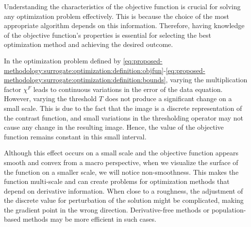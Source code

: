 			Understanding the characteristics of the objective function is crucial for solving any optimization problem effectively. This is because the choice of the most appropriate algorithm depends on this information. Therefore, having knowledge of the objective function's properties is essential for selecting the best optimization method and achieving the desired outcome.
			
			In the optimization problem defined by \eqref{eq:proposed-methodology:surrogate:optimization:definition:objfun}-\eqref{eq:proposed-methodology:surrogate:optimization:definition:bounds}, varying the multiplication factor $\chi^F$ leads to continuous variations in the error of the data equation. However, varying the threshold $T$ does not produce a significant change on a small scale. This is due to the fact that the image is a discrete representation of the contrast function, and small variations in the thresholding operator may not cause any change in the resulting image. Hence, the value of the objective function remains constant in this small interval.
			
			Although this effect occurs on a small scale and the objective function appears smooth and convex from a macro perspective, when we visualize the surface of the function on a smaller scale, we will notice non-smoothness. This makes the function multi-scale and can create problems for optimization methods that depend on derivative information. When close to a roughness, the adjustment of the discrete value for perturbation of the solution might be complicated, making the gradient point in the wrong direction. Derivative-free methods or population-based methods may be more efficient in such cases.
			
